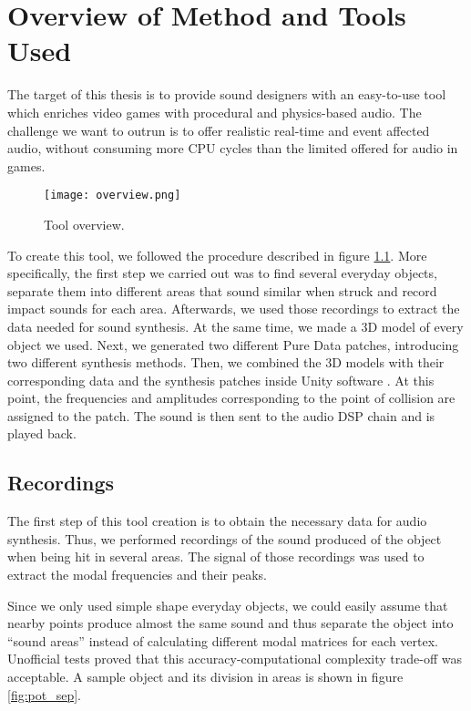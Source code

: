 \chapter{Overview of Method and Tools Used}\label{ch:method}
The target of this thesis is to provide sound designers with an easy-to-use tool which enriches video games with procedural and physics-based audio. The challenge we want to outrun is to offer realistic real-time and event affected audio, without consuming more CPU cycles than the limited offered for audio in games.

\begin{figure}[H]
  \centering
    \texttt{[image: overview.png]}
      \caption{Tool overview.}
      \label{fig:synth_proc}
\end{figure}

To create this tool, we followed the procedure described in figure \ref{fig:synth_proc}. More specifically, the first step we carried out was to find several everyday objects, separate them into different areas that sound similar when struck and record impact sounds for each area. Afterwards, we used those recordings to extract the data needed for sound synthesis. At the same time, we made a 3D model of every object we used. Next, we generated two different Pure Data patches, introducing two different synthesis methods. Then, we combined the 3D models with their corresponding data and the synthesis patches inside Unity\textsuperscript{\textregistered} software \cite{bib:unity}. At this point, the frequencies and amplitudes corresponding to the point of collision are assigned to the patch. The sound is then sent to the audio DSP chain and is played back. 

\section{Recordings}
The first step of this tool creation is to obtain the necessary data for audio synthesis. Thus, we performed recordings of the sound produced of the object when being hit in several areas. The signal of those recordings was used to extract the modal frequencies and their peaks. 

Since we only used simple shape everyday objects, we could easily assume that nearby points produce almost the same sound and thus separate the object into ``sound areas'' instead of calculating different modal matrices for each vertex. Unofficial tests proved that this accuracy-computational complexity trade-off was acceptable. A sample object and its division in areas is shown in figure \ref{fig:pot_sep}.

